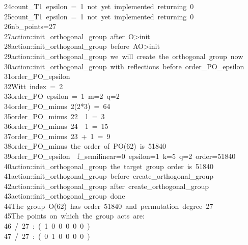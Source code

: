 \begin{tabbing}
24\>count\_T1\ epsilon\ =\ 1\ not\ yet\ implemented\ returning\ 0\\[0pt]
25\>count\_T1\ epsilon\ =\ 1\ not\ yet\ implemented\ returning\ 0\\[0pt]
26\>nb\_points=27\\[0pt]
27\>action::init\_orthogonal\_group\ after\ O>init\\[0pt]
28\>action::init\_orthogonal\_group\ before\ AO>init\\[0pt]
29\>action::init\_orthogonal\_group\ we\ will\ create\ the\ orthogonal\ group\ now\\[0pt]
30\>action::init\_orthogonal\_group\ with\ reflections\ before\ order\_PO\_epsilon\\[0pt]
31\>order\_PO\_epsilon\\[0pt]
32\>Witt\ index\ =\ 2\\[0pt]
33\>order\_PO\ epsilon\ =\ 1\ m=2\ q=2\\[0pt]
34\>order\_PO\_minus\ 2(2*3)\ =\ 64\\[0pt]
35\>order\_PO\_minus\ 22\ \ 1\ =\ 3\\[0pt]
36\>order\_PO\_minus\ 24\ \ 1\ =\ 15\\[0pt]
37\>order\_PO\_minus\ 23\ +\ 1\ =\ 9\\[0pt]
38\>order\_PO\_minus\ the\ order\ of\ PO(62)\ is\ 51840\\[0pt]
39\>order\_PO\_epsilon\ \ f\_semilinear=0\ epsilon=1\ k=5\ q=2\ order=51840\\[0pt]
40\>action::init\_orthogonal\_group\ the\ target\ group\ order\ is\ 51840\\[0pt]
41\>action::init\_orthogonal\_group\ before\ create\_orthogonal\_group\\[0pt]
42\>action::init\_orthogonal\_group\ after\ create\_orthogonal\_group\\[0pt]
43\>action::init\_orthogonal\_group\ done\\[0pt]
44\>The\ group\ O(62)\ has\ order\ 51840\ and\ permutation\ degree\ 27\\[0pt]
45\>The\ points\ on\ which\ the\ group\ acts\ are:\\[0pt]
46\ /\ 27\ :\ (\ 1\ 0\ 0\ 0\ 0\ 0\ )\\[0pt]
47\ /\ 27\ :\ (\ 0\ 1\ 0\ 0\ 0\ 0\ )\\[0pt]

\end{tabbing}
